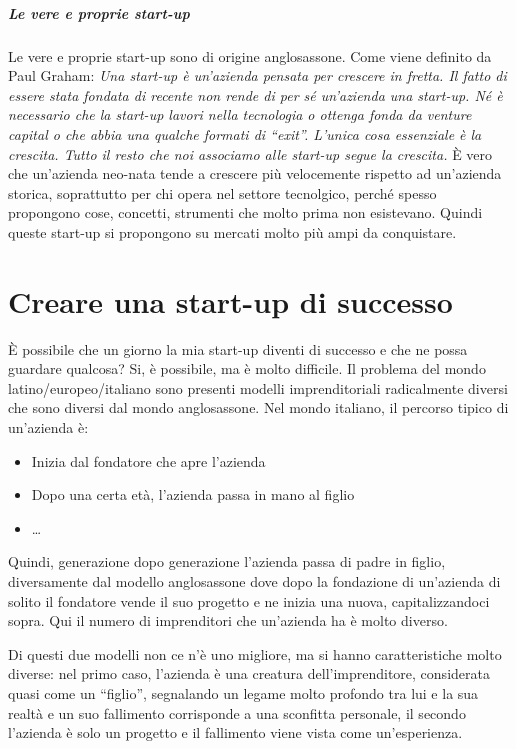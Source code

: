 \subparagraph*{Le vere e proprie start-up} Le vere e proprie start-up sono di
origine anglosassone. Come viene definito da Paul Graham:
\emph{
Una start-up è un'azienda pensata per crescere in fretta. Il fatto di essere
stata fondata di recente non rende di per sé un'azienda una start-up. Né è
necessario che la start-up lavori nella tecnologia o ottenga fonda da venture
capital o che abbia una qualche formati di ``exit''. L'unica cosa essenziale è
la crescita. Tutto il resto che noi associamo alle start-up segue la crescita.
}
È vero che un'azienda neo-nata tende a crescere più velocemente rispetto ad
un'azienda storica, soprattutto per chi opera nel settore tecnolgico, perché
spesso propongono cose, concetti, strumenti che molto prima non esistevano.
Quindi queste start-up si propongono su mercati molto più ampi da conquistare.

\section{Creare una start-up di successo}

È possibile che un giorno la mia start-up diventi di successo e che ne possa
guardare qualcosa? Si, è possibile, ma è molto difficile.
Il problema del mondo latino/europeo/italiano sono presenti modelli
imprenditoriali radicalmente diversi che sono diversi dal mondo anglosassone.
Nel mondo italiano, il percorso tipico di un'azienda è:
\begin{itemize}
 \item Inizia dal fondatore che apre l'azienda
 \item Dopo una certa età, l'azienda passa in mano al figlio
 \item \dots
\end{itemize}
Quindi, generazione dopo generazione l'azienda passa di padre in figlio,
diversamente dal modello anglosassone dove dopo la fondazione di
un'azienda di solito il fondatore vende il suo progetto e ne inizia una nuova,
capitalizzandoci sopra. Qui il numero di imprenditori che un'azienda ha è molto
diverso.

Di questi due modelli non ce n'è uno migliore, ma si hanno caratteristiche
molto diverse: nel primo caso, l'azienda è una creatura dell'imprenditore,
considerata quasi come un ``figlio'', segnalando un legame molto profondo tra
lui e la sua realtà e un suo fallimento corrisponde a una sconfitta personale,
il secondo l'azienda è solo un progetto e il fallimento viene vista come
un'esperienza.
